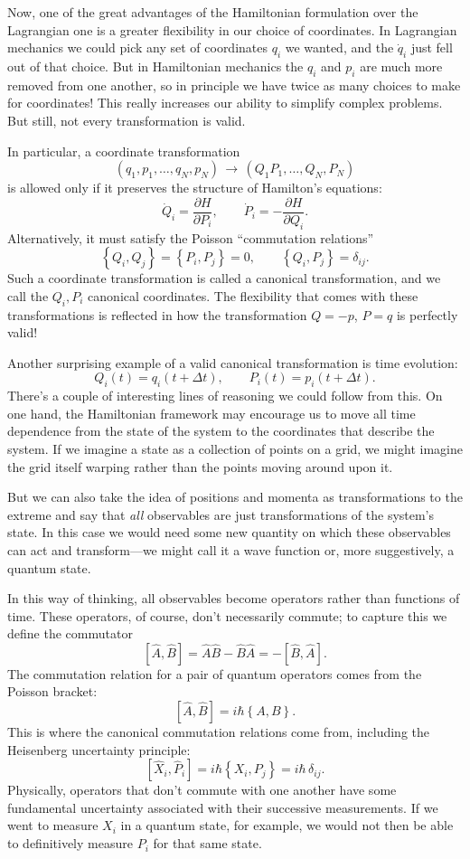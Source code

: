 \documentclass[../p111main.tex]{subfiles}
\begin{document}
Now, one of the great advantages of the Hamiltonian formulation over the Lagrangian one is a greater flexibility in our choice of coordinates.
In Lagrangian mechanics we could pick any set of coordinates $q_i$ we wanted, and the $\dot q_i$ just fell out of that choice.
But in Hamiltonian mechanics the $q_i$ and $p_i$ are much more removed from one another, so in principle we have twice as many choices to make for coordinates!
This really increases our ability to simplify complex problems.
But still, not every transformation is valid.

In particular, a coordinate transformation
\[ (q_1, p_1, \ldots, q_N, p_N) \, \to \, (Q_1 P_1, \ldots, Q_N, P_N) \]
is allowed only if it preserves the structure of Hamilton's equations:
\[ \dot Q_i = \frac{\partial H}{\partial P_i}, \qquad \dot P_i = -\frac{\partial H}{\partial Q_i}. \]
Alternatively, it must satisfy the Poisson ``commutation relations''
\[ \left\{ Q_i, Q_j \right\} = \left\{ P_i, P_j \right\} = 0, \qquad \left\{ Q_i, P_j \right\} = \delta_{ij}. \]
Such a coordinate transformation is called a canonical transformation, and we call the $Q_i, P_i$ canonical coordinates.
The flexibility that comes with these transformations is reflected in how the transformation $Q = -p$, $P = q$ is perfectly valid!

Another surprising example of a valid canonical transformation is time evolution:
\[ Q_i(t) = q_i(t + \Delta t), \qquad P_i(t) = p_i(t + \Delta t). \]
There's a couple of interesting lines of reasoning we could follow from this.
On one hand, the Hamiltonian framework may encourage us to move all time dependence from the state of the system to the coordinates that describe the system.
If we imagine a state as a collection of points on a grid, we might imagine the grid itself warping rather than the points moving around upon it.

But we can also take the idea of positions and momenta as transformations to the extreme and say that \textit{all} observables are just transformations of the system's state.
In this case we would need some new quantity on which these observables can act and transform---we might call it a wave function or, more suggestively, a quantum state.

In this way of thinking, all observables become operators rather than functions of time.
These operators, of course, don't necessarily commute; to capture this we define the commutator
\[ [\hat A, \hat B] = \hat A \hat B - \hat B \hat A = -[\hat B, \hat A]. \]
The commutation relation for a pair of quantum operators comes from the Poisson bracket:
\[ [\hat A, \hat B] = i \hbar \left\{ A, B \right\}. \]
This is where the canonical commutation relations come from, including the Heisenberg uncertainty principle:
\[ [\hat X_i, \hat P_i] = i\hbar \left\{ X_i, P_j \right\} = i\hbar \, \delta_{ij}. \]
Physically, operators that don't commute with one another have some fundamental uncertainty associated with their successive measurements.
If we went to measure $X_i$ in a quantum state, for example, we would not then be able to definitively measure $P_i$ for that same state.
\end{document}
